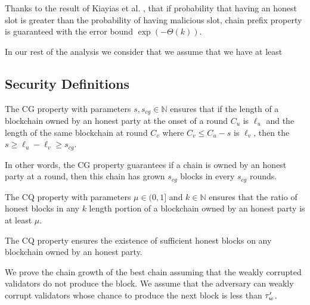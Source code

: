 	
Thanks to the result of  Kiayias et al. \cite{consistency}, that if probability that having an honest slot is greater than the probability of having malicious slot, chain prefix property is guaranteed with the error bound $ \exp(-\Theta(k)) $. 


In our rest of the analysis we consider that we assume that we have at least $  $

\subsection{Security Definitions}

\begin{definition} \label{def:cg}
	The CG  property with parameters $ s, s_{cg}\in \mathbb{N} $ ensures that if the length of a blockchain owned by an honest party at the onset of a round $ C_u $ is $ \ell_u $ and the length of the same blockchain at round $ C_v  $ where $ C_v \leq C_u - s  $ is $\ell_v$, then the $ s \geq \ell_u  - \ell_v \geq  s_{cg} $.
	
	
\end{definition}

In other words, the CG property guarantees if a chain is owned by an honest party at a round, then this chain has grown $ s_{cg}$ blocks in every $ s_{cg} $ rounds. 

\begin{definition}\label{def:cq}
	The CQ property with parameters $ \mu \in (0,1]  $ and $ k \in \mathbb{N} $ ensures that the ratio of honest blocks in any $ k $ length portion of a blockchain owned by an honest party is at least $ \mu $.
\end{definition} 

The CQ property ensures the existence of sufficient honest blocks on  any blockchain owned by an honest party.

We prove the chain growth of the best chain assuming that the weakly corrupted validators do not produce the block. We assume that the adversary can weakly corrupt validators whose chance to produce the next block is less than $ \tau_w' $.



